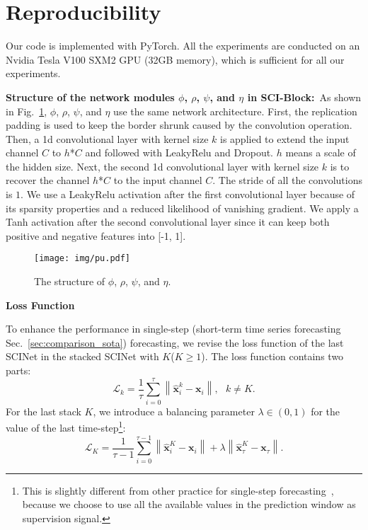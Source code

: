 \documentclass{article}
\begin{document}
\section{Reproducibility}
\label{appendix:reprod}
Our code is implemented with PyTorch. All the experiments are conducted on an Nvidia Tesla V100 SXM2 GPU (32GB memory), which is sufficient for all our experiments. 


\textbf{Structure of the network modules $\phi$, $\rho$, $\psi$, and $\eta$ in SCI-Block:}~As shown in Fig.~\ref{fig:PU}, $\phi$, $\rho$, $\psi$, and $\eta$ use the same network architecture.
First, the replication padding is used to keep the border shrunk caused by the convolution operation. Then, a 1d convolutional layer with kernel size $k$ is applied to extend the input channel $C$ to $h$*$C$ and followed with LeakyRelu and Dropout. $h$ means a scale of the hidden size. Next, the second 1d convolutional layer with kernel size $k$ is to recover the channel $h$*$C$ to the input channel $C$. The stride of all the convolutions is  $1$. We use a LeakyRelu activation after the first convolutional layer because of its sparsity properties and a reduced likelihood of vanishing gradient. We apply a Tanh activation after the second convolutional layer since it can keep both positive and negative features into [-1, 1].

\begin{figure}[h]
\centering
\texttt{[image: img/pu.pdf]}
\caption{The structure of $\phi$, $\rho$, $\psi$, and $\eta$.}
\label{fig:PU}
\end{figure}

\textbf{Loss Function}

To enhance the performance in single-step (short-term time series forecasting Sec.~\ref{sec:comparison_sota}) forecasting, we revise the loss function of the last SCINet in the stacked SCINet with $K$($K \geq 1$). The loss function contains two parts:
\begin{equation} \label{eq:mid_loss}
\mathcal{L}_{k} =  \frac{1}{\tau}\sum_{i=0}^{\tau}\left \| \hat{\mathbf{x}}^{k}_{i} - \mathbf{x}_{i} \right \|,~~~k\neq K .
\end{equation}
For the last stack $K$, we introduce a balancing parameter $\lambda \in (0,1)$ for the value of the last time-step\footnote{This is slightly different from other practice for single-step forecasting~\citep{Lai2018ModelingLA}, because we choose to use all the available values in the prediction window as supervision signal.}:
\begin{equation}\label{eq:last_loss}
             \mathcal{L}_{K} = \frac{1}{\tau-1}\sum_{i=0}^{\tau-1}\left \| \hat{\mathbf{x}}^{K}_{i} - \mathbf{x}_{i} \right \| + \lambda \left \| \hat{\mathbf{x}}^{K}_{\tau} - \mathbf{x}_{\tau} \right \|.
\end{equation}
\end{document}
